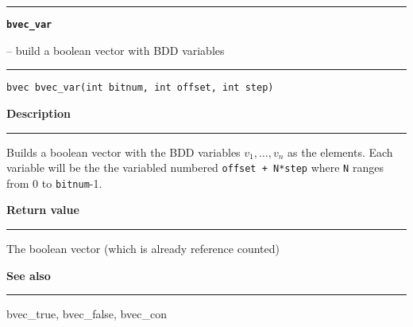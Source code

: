 \begin{minipage}{\textwidth}

\noindent\begin{minipage}{\textwidth}
\rule{\textwidth}{0.5mm}
{\tt\bf bvec\_var }
\--- build a boolean vector with BDD variables  \hspace{\fill}
\\\rule[1.5ex]{\textwidth}{0.5mm}
\end{minipage}

\noindent\begin{verbatim}
bvec bvec_var(int bitnum, int offset, int step) 
\end{verbatim}

\vspace{\parsep}\noindent
{\bf Description}\\\rule[1.5ex]{\textwidth}{0.2mm}\vspace{-1.5ex}\setlength{\parindent}{1em}
Builds a boolean vector with the BDD variables $v_1, \ldots,
           v_n$ as the elements. Each variable will be the the variabled
	   numbered {\tt offset + N*step} where {\tt N} ranges from 0 to
	   {\tt bitnum}-1.

\setlength{\parindent}{0em}\vspace{\parsep}\vspace{\baselineskip}\noindent
{\bf Return value}\\\rule[1.5ex]{\textwidth}{0.2mm}\vspace{-1.5ex}
The boolean vector (which is already reference counted) 

\vspace{\parsep}\vspace{\baselineskip}\noindent
{\bf See also}\\\rule[1.5ex]{\textwidth}{0.2mm}\vspace{-1.5ex}
bvec\_true, bvec\_false, bvec\_con 
\end{minipage}
\vspace{8ex}
